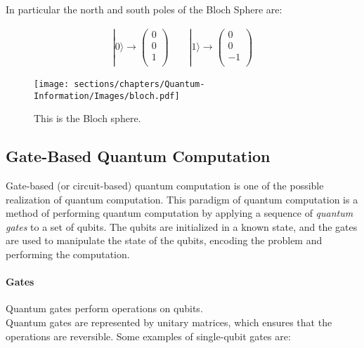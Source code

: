 In particular the north and south poles of the Bloch Sphere are:

\begin{align}
    | 0 \rangle \rightarrow 
    \begin{pmatrix}
        0 \\
        0 \\
        1 \\
    \end{pmatrix}
    \qquad
    | 1 \rangle \rightarrow 
    \begin{pmatrix}
        0 \\
        0 \\
        - 1 \\
    \end{pmatrix}
\end{align}

\begin{figure}[h]
    \centering
    \texttt{[image: sections/chapters/Quantum-Information/Images/bloch.pdf]}
    \caption{This is the Bloch sphere.}
    \label{fig:bloch-sphere}
\end{figure}


\subsection{Gate-Based Quantum Computation}

Gate-based (or circuit-based) quantum computation is one of the possible realization of quantum computation.
This paradigm of quantum computation is a method of performing quantum computation by applying a sequence of \textit{quantum gates} to a set of qubits. 
The qubits are initialized in a known state, and the gates are used to manipulate the state of the qubits, encoding the problem and 
performing the computation.

\paragraph*{Gates}

Quantum gates perform operations on qubits.\\
Quantum gates are represented by unitary matrices, which ensures that the operations are reversible.
Some examples of single-qubit gates are:

